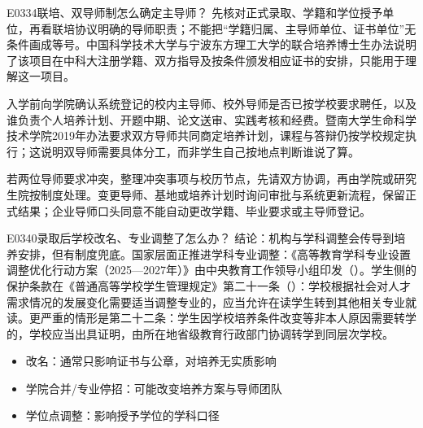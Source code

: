\begin{qa}{E0334}{联培、双导师制怎么确定主导师？}
先核对正式录取、学籍和学位授予单位，再看联培协议明确的导师职责；不能把“学籍归属、主导师单位、证书单位”无条件画成等号。中国科学技术大学与宁波东方理工大学的联合培养博士生办法说明了该项目在中科大注册学籍、双方指导及按条件颁发相应证书的安排，只能用于理解这一项目。 

入学前向学院确认系统登记的校内主导师、校外导师是否已按学校要求聘任，以及谁负责个人培养计划、开题中期、论文送审、实践考核和经费。暨南大学生命科学技术学院2019年办法要求双方导师共同商定培养计划，课程与答辩仍按学校规定执行；这说明双导师需要具体分工，而非学生自己按地点判断谁说了算。

若两位导师要求冲突，整理冲突事项与校历节点，先请双方协调，再由学院或研究生院按制度处理。变更导师、基地或培养计划时询问审批与系统更新流程，保留正式结果；企业导师口头同意不能自动更改学籍、毕业要求或主导师登记。
\end{qa}

\begin{qa}{E0340}{录取后学校改名、专业调整了怎么办？}
结论：机构与学科调整会传导到培养安排，但有制度兜底。国家层面正推进学科专业调整：《高等教育学科专业设置调整优化行动方案（2025—2027年）》由中央教育工作领导小组印发（）。学生侧的保护条款在《普通高等学校学生管理规定》第二十一条（）：学校根据社会对人才需求情况的发展变化需要适当调整专业的，应当允许在读学生转到其他相关专业就读。更严重的情形是第二十二条：学生因学校培养条件改变等非本人原因需要转学的，学校应当出具证明，由所在地省级教育行政部门协调转学到同层次学校。

\begin{itemize}
  \item 改名：通常只影响证书与公章，对培养无实质影响
  \item 学院合并/专业停招：可能改变培养方案与导师团队
  \item 学位点调整：影响授予学位的学科口径
\end{itemize}
\end{qa}

